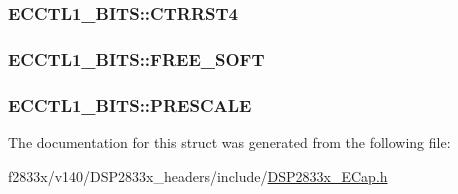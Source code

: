 \subsubsection[{C\+T\+R\+R\+S\+T4}]{ E\+C\+C\+T\+L1\+\_\+\+B\+I\+T\+S\+::\+C\+T\+R\+R\+S\+T4}\label{struct_e_c_c_t_l1___b_i_t_s_a856b9e8c71efcd3a46c8ae4ab41e5676}
\hypertarget{struct_e_c_c_t_l1___b_i_t_s_a6aee455b23fcba9d3f3957e075c14120}{}
\subsubsection[{F\+R\+E\+E\+\_\+\+S\+O\+F\+T}]{ E\+C\+C\+T\+L1\+\_\+\+B\+I\+T\+S\+::\+F\+R\+E\+E\+\_\+\+S\+O\+F\+T}\label{struct_e_c_c_t_l1___b_i_t_s_a6aee455b23fcba9d3f3957e075c14120}
\hypertarget{struct_e_c_c_t_l1___b_i_t_s_a3d52ff7e82a942c1fd1b0b1557b7ef76}{}
\subsubsection[{P\+R\+E\+S\+C\+A\+L\+E}]{ E\+C\+C\+T\+L1\+\_\+\+B\+I\+T\+S\+::\+P\+R\+E\+S\+C\+A\+L\+E}\label{struct_e_c_c_t_l1___b_i_t_s_a3d52ff7e82a942c1fd1b0b1557b7ef76}


The documentation for this struct was generated from the following file\+:\begin{DoxyCompactItemize}
\item 
f2833x/v140/\+D\+S\+P2833x\+\_\+headers/include/\hyperlink{_d_s_p2833x___e_cap_8h}{D\+S\+P2833x\+\_\+\+E\+Cap.\+h}\end{DoxyCompactItemize}
